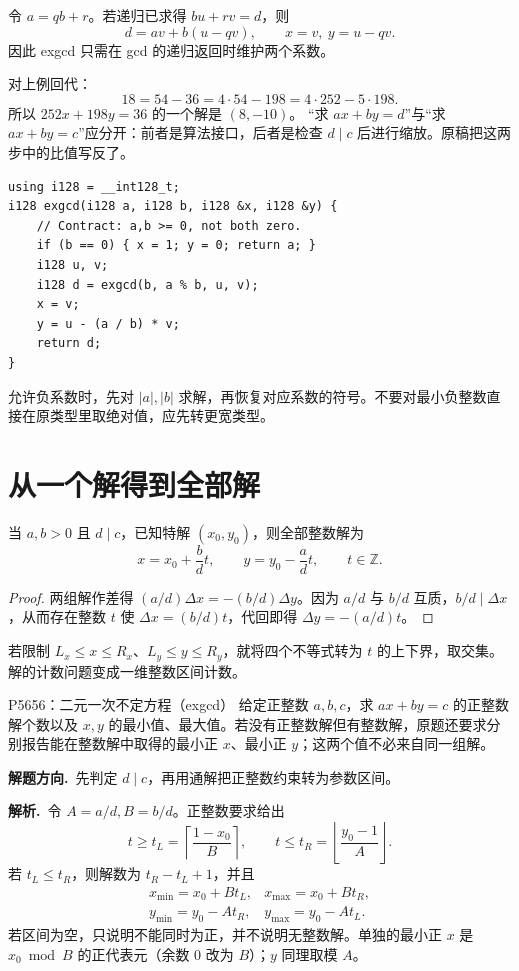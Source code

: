\documentclass[UTF8,a4paper,11pt,oneside,openany,fontset=fandol]{ctexbook}
\theoremstyle{definition}
\newcommand{\Z}{\mathbb Z}
\newcommand{\floor}[1]{\left\lfloor #1\right\rfloor}
\newcommand{\ceil}[1]{\left\lceil #1\right\rceil}
\newcommand{\sol}{\par\noindent\textbf{解析.}\ }
\newcommand{\hint}{\par\noindent\textbf{解题方向.}\ }
\begin{document}
令 $a=qb+r$。若递归已求得 $bu+rv=d$，则
\[
 d=av+b(u-qv),\qquad x=v,\ y=u-qv.
\]
因此 exgcd 只需在 gcd 的递归返回时维护两个系数。


对上例回代：
\[
18=54-36=4\cdot54-198=4\cdot252-5\cdot198.
\]
所以 $252x+198y=36$ 的一个解是 $(8,-10)$。
“求 $ax+by=d$”与“求 $ax+by=c$”应分开：前者是算法接口，后者是检查 $d\mid c$ 后进行缩放。原稿把这两步中的比值写反了。
\begin{lstlisting}
using i128 = __int128_t;
i128 exgcd(i128 a, i128 b, i128 &x, i128 &y) {
    // Contract: a,b >= 0, not both zero.
    if (b == 0) { x = 1; y = 0; return a; }
    i128 u, v;
    i128 d = exgcd(b, a % b, u, v);
    x = v;
    y = u - (a / b) * v;
    return d;
}
\end{lstlisting}
允许负系数时，先对 $|a|,|b|$ 求解，再恢复对应系数的符号。不要对最小负整数直接在原类型里取绝对值，应先转更宽类型。


\section{从一个解得到全部解}
当 $a,b>0$ 且 $d\mid c$，已知特解 $(x_0,y_0)$，则全部整数解为
\[
 x=x_0+\frac bd t,\qquad y=y_0-\frac ad t,\qquad t\in\Z.
\]
\begin{proof}
两组解作差得 $(a/d)\Delta x=-(b/d)\Delta y$。因为 $a/d$ 与 $b/d$ 互质，$b/d\mid\Delta x$，从而存在整数 $t$ 使 $\Delta x=(b/d)t$，代回即得 $\Delta y=-(a/d)t$。
\end{proof}
若限制 $L_x\le x\le R_x$、$L_y\le y\le R_y$，就将四个不等式转为 $t$ 的上下界，取交集。解的计数问题变成一维整数区间计数。

\begin{problem}{P5656：二元一次不定方程（exgcd）}
给定正整数 $a,b,c$，求 $ax+by=c$ 的正整数解个数以及 $x,y$ 的最小值、最大值。若没有正整数解但有整数解，原题还要求分别报告能在整数解中取得的最小正 $x$、最小正 $y$；这两个值不必来自同一组解。
\end{problem}
\hint 先判定 $d\mid c$，再用通解把正整数约束转为参数区间。

\sol 令 $A=a/d,B=b/d$。正整数要求给出
\[
 t\ge t_L=\ceil{\frac{1-x_0}{B}},\qquad
 t\le t_R=\floor{\frac{y_0-1}{A}}.
\]
若 $t_L\le t_R$，则解数为 $t_R-t_L+1$，并且
\[
\begin{array}{ll}
x_{\min}=x_0+Bt_L,&x_{\max}=x_0+Bt_R,\\
y_{\min}=y_0-At_R,&y_{\max}=y_0-At_L.
\end{array}
\]
若区间为空，只说明不能同时为正，并不说明无整数解。单独的最小正 $x$ 是 $x_0\bmod B$ 的正代表元（余数 $0$ 改为 $B$）；$y$ 同理取模 $A$。
\end{document}
